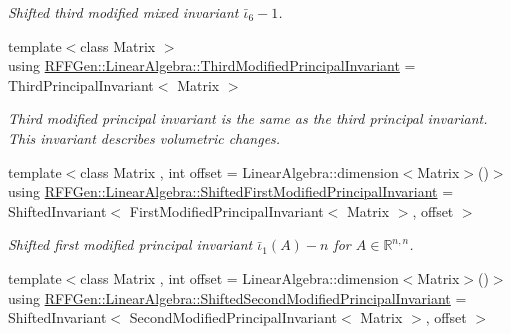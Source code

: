 \begin{DoxyCompactItemize}
\begin{DoxyCompactList}\small\item\em Shifted third modified mixed invariant $ \bar\iota_6 - 1 $. \end{DoxyCompactList}\item 
\hypertarget{group__LinearAlgebraGroup_gaa792be731084cbbbc5156be9ea1b34ef}{{\footnotesize template$<$class Matrix $>$ }\\using \hyperlink{group__LinearAlgebraGroup_gaa792be731084cbbbc5156be9ea1b34ef}{R\-F\-F\-Gen\-::\-Linear\-Algebra\-::\-Third\-Modified\-Principal\-Invariant} = Third\-Principal\-Invariant$<$ Matrix $>$}\label{group__LinearAlgebraGroup_gaa792be731084cbbbc5156be9ea1b34ef}

\begin{DoxyCompactList}\small\item\em Third modified principal invariant is the same as the third principal invariant. This invariant describes volumetric changes. \end{DoxyCompactList}\item 
\hypertarget{group__LinearAlgebraGroup_gae337e31060263dfcdbcdd5301659a79c}{{\footnotesize template$<$class Matrix , int offset = Linear\-Algebra\-::dimension$<$\-Matrix$>$()$>$ }\\using \hyperlink{group__LinearAlgebraGroup_gae337e31060263dfcdbcdd5301659a79c}{R\-F\-F\-Gen\-::\-Linear\-Algebra\-::\-Shifted\-First\-Modified\-Principal\-Invariant} = Shifted\-Invariant$<$ First\-Modified\-Principal\-Invariant$<$ Matrix $>$, offset $>$}\label{group__LinearAlgebraGroup_gae337e31060263dfcdbcdd5301659a79c}

\begin{DoxyCompactList}\small\item\em Shifted first modified principal invariant $ \bar\iota_1(A) - n $ for $ A\in\mathbb{R}^{n,n} $. \end{DoxyCompactList}\item 
\hypertarget{group__LinearAlgebraGroup_ga8d736a3e8713fe3445b04dd4ead07788}{{\footnotesize template$<$class Matrix , int offset = Linear\-Algebra\-::dimension$<$\-Matrix$>$()$>$ }\\using \hyperlink{group__LinearAlgebraGroup_ga8d736a3e8713fe3445b04dd4ead07788}{R\-F\-F\-Gen\-::\-Linear\-Algebra\-::\-Shifted\-Second\-Modified\-Principal\-Invariant} = Shifted\-Invariant$<$ Second\-Modified\-Principal\-Invariant$<$ Matrix $>$, offset $>$}\label{group__LinearAlgebraGroup_ga8d736a3e8713fe3445b04dd4ead07788}


\end{DoxyCompactItemize}
